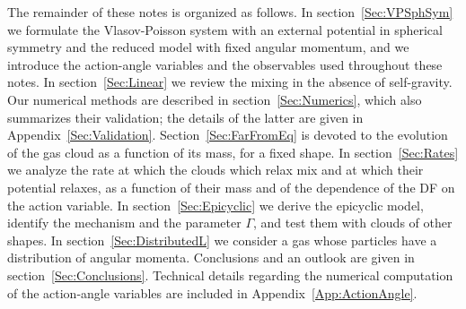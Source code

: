 The remainder of these notes is organized as follows. In section~\ref{Sec:VPSphSym} we formulate the Vlasov-Poisson system with an external potential in spherical symmetry and the reduced model with fixed angular momentum, and we introduce the action-angle variables and the observables used throughout these notes. In section~\ref{Sec:Linear} we review the mixing in the absence of self-gravity. Our numerical methods are described in section~\ref{Sec:Numerics}, which also summarizes their validation; the details of the latter are given in Appendix~\ref{Sec:Validation}. Section~\ref{Sec:FarFromEq} is devoted to the evolution of the gas cloud as a function of its mass, for a fixed shape. In section~\ref{Sec:Rates} we analyze the rate at which the clouds which relax mix and at which their potential relaxes, as a function of their mass and of the dependence of the DF on the action variable. In section~\ref{Sec:Epicyclic} we derive the epicyclic model, identify the mechanism and the parameter $\Gamma$, and test them with clouds of other shapes. In section~\ref{Sec:DistributedL} we consider a gas whose particles have a distribution of angular momenta. Conclusions and an outlook are given in section~\ref{Sec:Conclusions}. Technical details regarding the numerical computation of the action-angle variables are included in Appendix~\ref{App:ActionAngle}.
